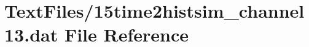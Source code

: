 \hypertarget{15time2histsim__channel13_8dat}{}\section{Text\+Files/15time2histsim\+\_\+channel13.dat File Reference}
\label{15time2histsim__channel13_8dat}
